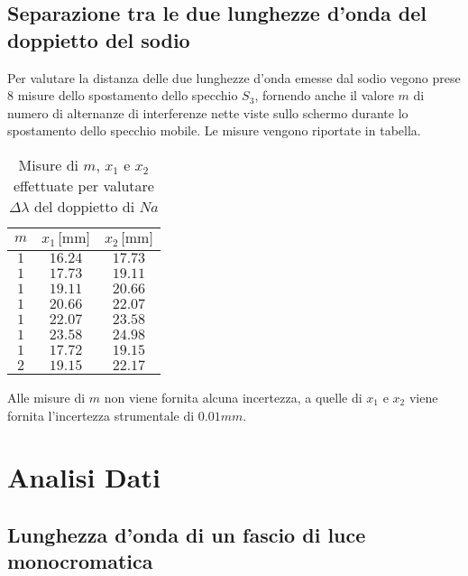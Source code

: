 \documentclass[]{article}
\let\oldsection\section%
\renewcommand{\section}{%
	\renewcommand{\theequation}{\thesection.\arabic{equation}}%
	\oldsection}%
\let\oldsubsection\subsection%
\renewcommand{\subsection}{%
	\renewcommand{\theequation}{\thesubsection.\arabic{equation}}%
	\oldsubsection}%
\begin{document}
\subsection{Separazione tra le due lunghezze d'onda del doppietto del sodio}

Per valutare la distanza delle due lunghezze d'onda emesse dal sodio vegono prese 8 misure dello spostamento dello specchio $S_3$, fornendo anche il valore $m$ di numero di alternanze di interferenze nette viste sullo schermo durante lo spostamento dello specchio mobile. Le misure vengono riportate in tabella.

\begin{table}[H]
    \centering

    \begin{tabular}{||c|c|c||}
        \hline
        $m $ & $x_1 \, \text{[mm]}$ & $x_2\, \text{[mm]}$ \\
        \hline\hline

        $1$ & $16.24$ & $17.73$ \\\hline
        $1$ & $17.73$ & $19.11$ \\\hline
        $1$ & $19.11$ & $20.66$ \\\hline
        $1$ & $20.66$ & $22.07$ \\\hline
        $1$ & $22.07$ & $23.58$ \\\hline
        $1$ & $23.58$ & $24.98$ \\\hline
        $1$ & $17.72$ & $19.15$ \\\hline
        $2$ & $19.15$ & $22.17$ \\\hline
    
    \end{tabular}
    \caption{Misure di $m$, $x_1$ e $x_2$ effettuate per valutare $\Delta \lambda$ del doppietto di $Na$ }
    \label{sodio}    
\end{table}

Alle misure di $m$ non viene fornita alcuna incertezza, a quelle di $x_1$ e $x_2$ viene fornita l'incertezza strumentale di $0.01mm$.


\section{Analisi Dati}

\subsection{Lunghezza d'onda di un fascio di luce monocromatica}
\end{document}
